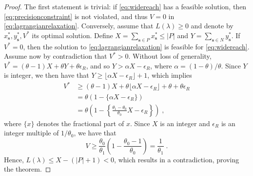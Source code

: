 \documentclass[11pt]{article}
\theoremstyle{definition}
\newcommand{\vect}[1]{\mathbf{#1}}
\newcommand{\sv}[1]{_{\vect{#1}}}
\begin{document}
\begin{proof}
The first statement is trivial: if \eqref{eq:widereach} has a feasible solution, 
then \eqref{eq:precisionconstraint} is not violated, and thus $V = 0$ in
\eqref{eq:lagrangianrelaxation}.
Conversely, assume that $L(\lambda) \geq 0$
and denote by $x^*\sv{s}, y^*\sv{s}, V^*$ its optimal solution.
Define $X = \sum_{\vect{s} \in P} x^*\sv{s} \leq |P|$ and 
$Y = \sum_{\vect{s} \in N} y^*\sv{s}$.
If $V^* = 0$, then the solution to \eqref{eq:lagrangianrelaxation} 
is feasible for \eqref{eq:widereach}.
Assume now by contradiction that $V^* > 0$.
Without loss of generality, 
$V^* = (\theta  - 1) X + \theta Y + \theta \epsilon_R$,
and so $Y > \alpha X - \epsilon_R$, where
$\alpha = (1 - \theta) / \theta$.
Since $Y$ is integer, we then have that
$Y \geq \lfloor \alpha X - \epsilon_R \rfloor + 1$,
which implies
\begin{equation*}
    \begin{split}
V^* &\geq (\theta  - 1) X + \theta \lfloor \alpha X - \epsilon_R \rfloor + 
\theta + \theta \epsilon_R \\
& = \theta \left( 1 - \{ \alpha X - \epsilon_R \} \right) \\
& = \theta \left( 1 - 
\left\{ \frac{\theta_1 - \theta_0}{\theta_0} X - \epsilon_R \right\} \right)\;,
\end{split}
\end{equation*}
where $\{ x \}$ denotes the fractional part of $x$.
Since $X$ is an integer and $\epsilon_R$ is an integer multiple of 
$1 / \theta_0$,
we have that
$$V \geq \frac{\theta_0}{\theta_1} \left(1 - \frac{\theta_0 - 1}{\theta_0} \right)
= \frac{1}{\theta_1}\;.$$
Hence, 
$L(\lambda) \leq X - (|P| + 1) < 0$,
which results in a contradiction, proving the theorem.
\end{proof}
\end{document}
